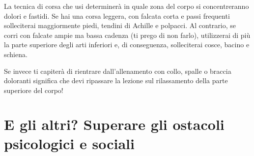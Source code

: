 La tecnica di corsa che usi determinerà in quale zona
del corpo si concentreranno dolori e fastidi.
Se hai una corsa leggera, con falcata corta e passi frequenti
solleciterai maggiormente piedi, tendini di Achille e polpacci.
Al contrario, se corri con falcate ampie ma bassa cadenza
(ti prego di non farlo),
utilizzerai di più la parte superiore degli arti inferiori
e, di conseguenza, solleciterai cosce, bacino e schiena.

Se invece ti capiterà di rientrare dall'allenamento con
collo, spalle o braccia doloranti significa che devi ripassare
la lezione sul rilassamento della parte superiore del corpo!


\chapter{E gli altri? Superare gli ostacoli psicologici e sociali}

